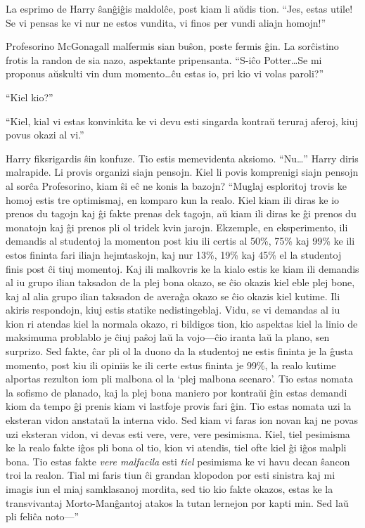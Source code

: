 La esprimo de Harry ŝanĝiĝis maldolĉe, post kiam li aŭdis tion. ``Jes,
estas utile! Se vi pensas ke vi nur ne estos vundita, vi finos per vundi
aliajn homojn!''

Profesorino McGonagall malfermis sian buŝon, poste fermis ĝin. La
sorĉistino frotis la randon de sia nazo, aspektante
pripensanta. ``S-iĉo Potter\ldots Se mi proponus aŭskulti vin dum
momento\ldots ĉu estas io, pri kio vi volas paroli?''

``Kiel kio?''

``Kiel, kial vi estas konvinkita ke vi devu esti singarda kontraŭ
teruraj aferoj, kiuj povus okazi al vi.''

Harry fiksrigardis ŝin konfuze. Tio estis memevidenta
aksiomo. ``Nu\ldots'' Harry diris malrapide. Li provis organizi siajn
pensojn. Kiel li povis komprenigi siajn pensojn al sorĉa Profesorino,
kiam ŝi eĉ ne konis la bazojn? ``Muglaj esploritoj trovis ke homoj
estis tre optimismaj, en komparo kun la realo. Kiel kiam ili diras ke
io prenos du tagojn kaj ĝi fakte prenas dek tagojn, aŭ kiam ili diras
ke ĝi prenos du monatojn kaj ĝi prenos pli ol tridek kvin
jarojn. Ekzemple, en eksperimento, ili demandis al studentoj la
momenton post kiu ili certis al 50\%, 75\% kaj 99\% ke ili estos
fininta fari iliajn hejmtaskojn, kaj nur 13\%, 19\% kaj 45\% el la
studentoj finis post ĉi tiuj momentoj. Kaj ili malkovris ke la kialo
estis ke kiam ili demandis al iu grupo ilian taksadon de la plej bona
okazo, se ĉio okazis kiel eble plej bone, kaj al alia grupo ilian
taksadon de averaĝa okazo se ĉio okazis kiel kutime. Ili akiris
respondojn, kiuj estis statike nedistingeblaj. Vidu, se vi demandas al
iu kion ri atendas kiel la normala okazo, ri bildigos tion, kio
aspektas kiel la linio de maksimuma problablo je ĉiuj paŝoj laŭ la
vojo—ĉio iranta laŭ la plano, sen surprizo. Sed fakte, ĉar pli ol la
duono da la studentoj ne estis fininta je la ĝusta momento, post kiu
ili opiniis ke ili certe estus fininta je 99\%, la realo kutime
alportas rezulton iom pli malbona ol la `plej malbona scenaro'. Tio
estas nomata la sofismo de planado, kaj la plej bona maniero por
kontraŭi ĝin estas demandi kiom da tempo ĝi prenis kiam vi lastfoje
provis fari ĝin. Tio estas nomata uzi la eksteran vidon anstataŭ la
interna vido. Sed kiam vi faras ion novan kaj ne povas uzi eksteran
vidon, vi devas esti vere, vere, vere pesimisma. Kiel, tiel pesimisma
ke la realo fakte iĝos pli bona ol tio, kion vi atendis, tiel ofte
kiel ĝi iĝos malpli bona. Tio estas fakte \emph{vere malfacila} esti
\emph{tiel} pesimisma ke vi havu decan ŝancon troi la realon. Tial mi
faris tiun ĉi grandan klopodon por esti sinistra kaj mi imagis iun el
miaj samklasanoj mordita, sed tio kio fakte okazos, estas ke la
transvivantaj Morto-Manĝantoj atakos la tutan lernejon por kapti
min. Sed laŭ pli feliĉa noto—''

